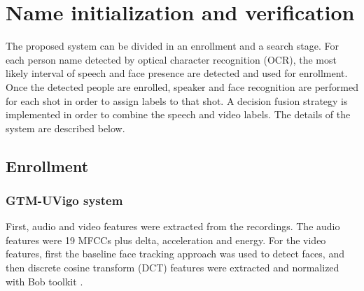 \section{Name initialization and verification}
\label{sec:verification}


The proposed system can be divided in an enrollment and a search stage. For each person name detected by optical character recognition (OCR), the most likely interval
of speech and face presence are detected and used for enrollment.
Once the detected people are enrolled, speaker and face recognition
are performed for each shot in order to assign labels to that shot. 
A decision fusion strategy is implemented in order to combine the speech and video labels. The details of the system
are described below.

\subsection{Enrollment}

\subsubsection{GTM-UVigo system}
First, audio and video features were extracted from the recordings. The audio features were 19 MFCCs plus delta, acceleration and energy. For the video features, first
the baseline face tracking approach was used to detect faces, and then discrete cosine transform (DCT) features \cite{mccool2009} were extracted and normalized with Bob toolkit \cite{bob2012}.

